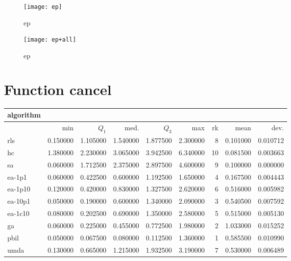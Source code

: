 \begin{center}
\begin{figure}[h]
\centering
\texttt{[image: ep]}
\caption{ep}
\end{figure}
\end{center}

\begin{center}
\begin{figure}[h]
\centering
\texttt{[image: ep+all]}
\caption{ep}
\end{figure}
\end{center}

\newpage

\section{Function cancel}
\begin{center}
\begin{tabular}{@{}l*{5}{>{{}}N{1}{2}}>{{}}N{2}{0}N{1}{3}N{1}{3}@{}}
\toprule
{algorithm} &  &  \\
\midrule
& {min} & {$Q_1$} & {med.} & {$Q_3$} & {max} & {rk} & {mean} & {dev.} \\
\midrule
rls & 0.150000 & 1.105000 & 1.540000 & 1.877500 & 2.300000 & 8 & 0.101000 & 0.010712 \\
 hc & 1.380000 & 2.230000 & 3.065000 & 3.942500 & 6.340000 & 10 & 0.081500 & 0.003663 \\
 sa & 0.060000 & 1.712500 & 2.375000 & 2.897500 & 4.600000 & 9 & 0.100000 & 0.000000 \\
 ea-1p1 & 0.060000 & 0.422500 & 0.600000 & 1.192500 & 1.650000 & 4 & 0.167500 & 0.004443 \\
 ea-1p10 & 0.120000 & 0.420000 & 0.830000 & 1.327500 & 2.620000 & 6 & 0.516000 & 0.005982 \\
 ea-10p1 & {\color{blue}} 0.050000 & 0.190000 & 0.600000 & 1.340000 & 2.090000 & 3 & 0.540500 & 0.007592 \\
 ea-1c10 & 0.080000 & 0.202500 & 0.690000 & 1.350000 & 2.580000 & 5 & 0.515000 & 0.005130 \\
 ga & 0.060000 & 0.225000 & 0.455000 & 0.772500 & 1.980000 & 2 & 1.033000 & 0.015252 \\
 pbil & {\color{blue}} 0.050000 & {\color{blue}} 0.067500 & {\color{blue}} 0.080000 & {\color{blue}} 0.112500 & {\color{blue}} 1.360000 & 1 & 0.585500 & 0.010990 \\
 umda & 0.130000 & 0.665000 & 1.215000 & 1.932500 & 3.190000 & 7 & 0.530000 & 0.006489 \\
 \bottomrule
\end{tabular}
\end{center}


